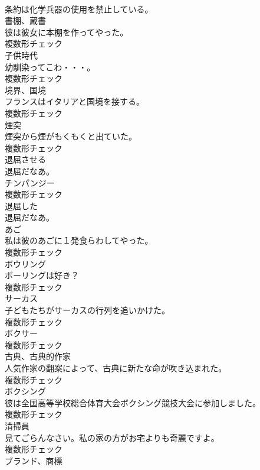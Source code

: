 \documentclass[8pt]{extreport}
\begin{document}
\begin{CJK}{UTF8}{min}
\\	条約は化学兵器の使用を禁止している。	
\\	[名詞]	書棚、蔵書	
\\	彼は彼女に本棚を作ってやった。	
\\	複数形チェック
\\	[名詞]	子供時代	
\\	幼馴染ってこわ・・・。	
\\	複数形チェック
\\	[名詞]	境界、国境	
\\	フランスはイタリアと国境を接する。	
\\	複数形チェック
\\	[名詞]	煙突	
\\	煙突から煙がもくもくと出ていた。	
\\	複数形チェック
\\	[動詞]	退屈させる	
\\	退屈だなあ。	
\\	[名詞]	チンパンジー	
\\	複数形チェック
\\	[形容詞]	退屈した	
\\	退屈だなあ。	
\\	[名詞]	あご	
\\	私は彼のあごに１発食らわしてやった。	
\\	複数形チェック
\\	[名詞]	ボウリング	
\\	ボーリングは好き？	
\\	複数形チェック
\\	[名詞]	サーカス	
\\	子どもたちがサーカスの行列を追いかけた。	
\\	複数形チェック
\\	[名詞]	ボクサー	
\\	複数形チェック
\\	[名詞]	古典、古典的作家	
\\	人気作家の翻案によって、古典に新たな命が吹き込まれた。	
\\	複数形チェック
\\	[名詞]	ボクシング	
\\	彼は全国高等学校総合体育大会ボクシング競技大会に参加しました。	
\\	複数形チェック
\\	[名詞]	清掃員	
\\	見てごらんなさい。私の家の方がお宅よりも奇麗ですよ。	
\\	複数形チェック
\\	[名詞]	ブランド、商標	

\end{CJK}
\end{document}
